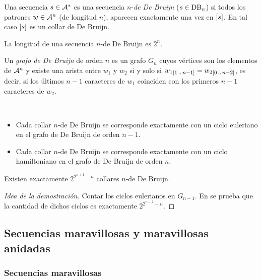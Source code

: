 \documentclass[11pt]{article}
\begin{document}
\begin{definition}
	Una secuencia $s \in \mathcal{A}^*$ es una secuencia $n$-\emph{de De Bruijn}
	($s \in \text{DB}_{n}$) si todos los patrones $w \in \mathcal{A}^n$ (de longitud $n$),
	aparecen exactamente una vez en $\left[s\right]$. En tal caso $\left[s\right]$ es un
	collar de De Bruijn.
\end{definition}

\begin{remark}
	La longitud de una secuencia $n$-de De Bruijn es $2^n$.
\end{remark}

\begin{definition}
	Un \emph{grafo de De Bruijn} de orden $n$ es un grafo $G_n$ cuyos vértices
	son los elementos de $\mathcal{A}^n$ y existe una arista entre $w_1$ y $w_2$ si
	y solo si ${w_1}_{[1\,..\,n-1]} = {w_2}_{[0\,..\,n-2]}$, es decir, si los
	últimos $n-1$ caracteres de $w_1$ coinciden con los primeros $n-1$ caracteres
	de $w_2$.
\end{definition}

\begin{remark}\ %
	\begin{itemize}
		\item Cada collar $n$-de De Bruijn se corresponde exactamente con un ciclo
		      euleriano en el grafo de De Bruijn de orden $n - 1$.
		\item Cada collar $n$-de De Bruijn se corresponde exactamente con un ciclo
		      hamiltoniano en el grafo de De Bruijn de orden $n$.
	\end{itemize}
\end{remark}

\begin{proposition}
	Existen exactamente $2^{2^{n+1} - n}$ collares $n$-de De Bruijn.
\end{proposition}

\begin{proof}[Idea de la demostración]
	Contar los ciclos eulerianos en $G_{n-1}$.
	En \cite{db} se prueba que la cantidad de dichos ciclos es exactamente
	$2^{2^{n-1} - n}$.
\end{proof}

\subsection{Secuencias maravillosas y maravillosas anidadas}

\subsubsection{Secuencias maravillosas}
\end{document}
